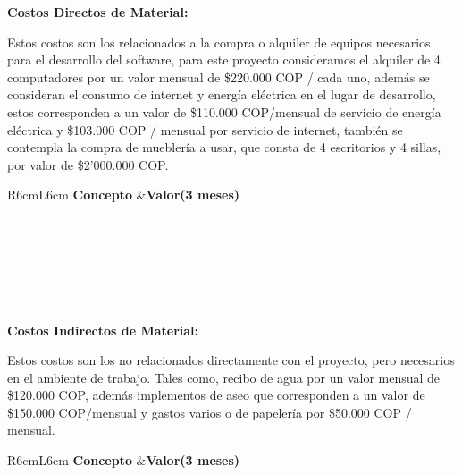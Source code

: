 \documentclass[a4paper,12 pt]{article}
\begin{document}
\textbf{Costos Directos de Material:}

Estos costos son los relacionados a la compra o alquiler de equipos necesarios 
para el desarrollo del software, para este proyecto consideramos el alquiler de 
4 computadores \cite{02} por un valor mensual de \$220.000 COP / cada uno, además se consideran 
el consumo de internet y energía eléctrica en el lugar de desarrollo, estos corresponden a un valor de \$110.000 COP/mensual de servicio 
de energía eléctrica y \$103.000 COP / mensual por servicio de internet, también se contempla la compra de mueblería a usar, que consta de 4 escritorios y 4 sillas, por valor de \$2'000.000 COP.

\begin{table}[H]
    \centering
    \small{
    \begin{tabular}{R{6cm}L{6cm}}
        \textbf{Concepto}   &\textbf{Valor(3 meses)}\\
        \\
         \\
         \\
         \\
         \\
        \hline
         \\
    \end{tabular}
    \label{T03}}
\end{table}{}

\textbf{Costos Indirectos de Material:}

Estos costos son los no relacionados directamente con el proyecto, pero necesarios en el ambiente de trabajo.
Tales como, recibo de agua por un valor mensual de \$120.000 COP, además implementos de aseo que corresponden a un valor de \$150.000 COP/mensual y gastos varios o de papelería por \$50.000 COP / mensual.

\begin{table}[H]
    \centering
    \small{
    \begin{tabular}{R{6cm}L{6cm}}
        \textbf{Concepto}   &\textbf{Valor(3 meses)}\\
        \\
         \\
         \\
         \\
        \hline
         \\
    \end{tabular}
    \label{T203}}
\end{table}{}
\end{document}
